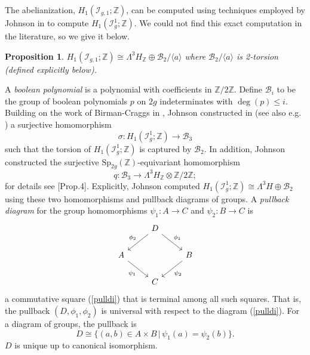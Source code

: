 \documentclass[a4paper]{amsproc}
\theoremstyle{TheoremNum}
\theoremstyle{Theorembold}
\newtheorem{prop}[thm]{Proposition}
\theoremstyle{TheoremboldDef}
\theoremstyle{TheoremboldRem}
\theoremstyle{TheoremboldRem}
\begin{document}
The abelianization, $H_1({{\mathcal{I}}_{g,1}};{\mathbb{Z}})$, can be computed using techniques employed by Johnson in \cite{johnsonstructure3} to compute $H_1({{\mathcal{I}}_{g}^{1}};{\mathbb{Z}})$. We could not find this exact computation in the literature, so we give it below.\\

\begin{prop}\label{computeH1}
$H_1({{\mathcal{I}}_{g,1}};{\mathbb{Z}})\cong \Lambda^3 H_{\mathbb{Z}}\oplus \mathcal{B}_2/\langle a\rangle$ where $\mathcal{B}_2/\langle a\rangle$ is 2-torsion (defined explicitly below).
\end{prop}

A \emph{boolean polynomial} is a polynomial with coefficients in ${\mathbb{Z}}/2{\mathbb{Z}}$. Define $\mathcal{B}_i$ to be the group of boolean polynomials $p$  on $2g$ indeterminates with $\deg(p){\leqslant} i$. Building on the work of Birman-Craggs in \cite{birmancraggs}, Johnson constructed in \cite[Th.6]{johnsonbirman} (see also e.g. \cite[Th.6.19]{primer}) a surjective homomorphism \[\sigma:H_1({{\mathcal{I}}_{g}^{1}};{\mathbb{Z}})\to \mathcal{B}_3\] such that the torsion of $H_1({{\mathcal{I}}_{g}^{1}};{\mathbb{Z}})$ is captured by $\mathcal{B}_2$. In addition, Johnson constructed the surjective ${\text{Sp}_{2g}({\mathbb{Z}})}$-equivariant homomorphism
\[q:\mathcal{B}_3\to \Lambda^3H_{\mathbb{Z}}\otimes {\mathbb{Z}}/2{\mathbb{Z}};\] for details see \cite{johnsonstructure3}[Prop.4]. Explicitly, Johnson computed $H_1({{\mathcal{I}}_{g}^{1}};{\mathbb{Z}})\cong \Lambda^3H\oplus \mathcal{B}_2$ using these two homomorphisms and pullback diagrams of groups. A \emph{pullback diagram} for the group homomorphisms $\psi_1:A\to C$ and  $\psi_2:B\to C$ is
\begin{equation}\label{pulldi}\begin{tikzcd}
{}
& D \arrow{dr}{\phi_1} \arrow{dl}[swap]{\phi_2} \\
A \arrow[swap]{dr}{\psi_1} & & 
B \arrow{dl}{\psi_2} \\
& C
\end{tikzcd} 
\end{equation}
 a commutative square (\ref{pulldi}) that is terminal among all such squares. That is, the pullback $(D,\phi_1,\phi_2)$ is universal with respect to the diagram (\ref{pulldi}). For a diagram of groups, the pullback is \[D\cong\{(a,b)\in A\times B\,|\, \psi_1(a)=\psi_2(b)\}.\] $D$ is unique up to canonical isomorphism.\\
\end{document}
